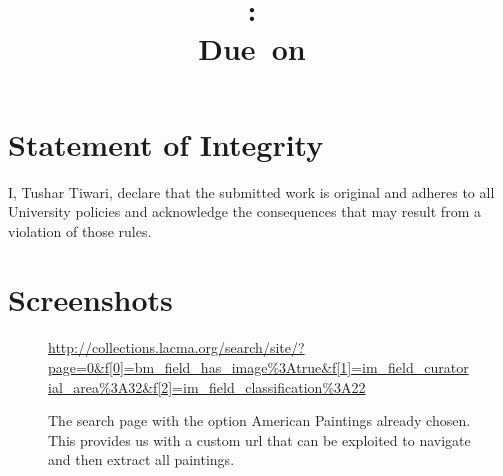 \documentclass{article}
\title{
    \vspace{2in}
    \textmd{\textbf{\hmwkClass:\ \hmwkTitle}}\\
    \normalsize\vspace{0.1in}\small{Due\ on\ \hmwkDueDate}\\
    \vspace{0.1in}\large{\textit{\hmwkClassInstructor}}
    \vspace{3in}
}
\author{\textbf{\hmwkAuthorName}}
\date{}
\begin{document}
\maketitle

\pagebreak

\begin{flushleft}
\section{Statement of Integrity}
I, Tushar Tiwari, declare that the submitted work is original and adheres to all University policies and acknowledge the consequences that may result from a violation of those rules.
\section{Screenshots}
\begin{figure}[h]
\centering
{}
\urldef\myurl\url{http://collections.lacma.org/search/site/?page=0&f[0]=bm_field_has_image%3Atrue&f[1]=im_field_curatorial_area%3A32&f[2]=im_field_classification%3A22}
\caption{The search page with the option American Paintings already chosen. \\ This provides us with a custom url that can be exploited to navigate and then extract all paintings. \\ \myurl}
\end{figure}


\end{flushleft}
\end{document}
